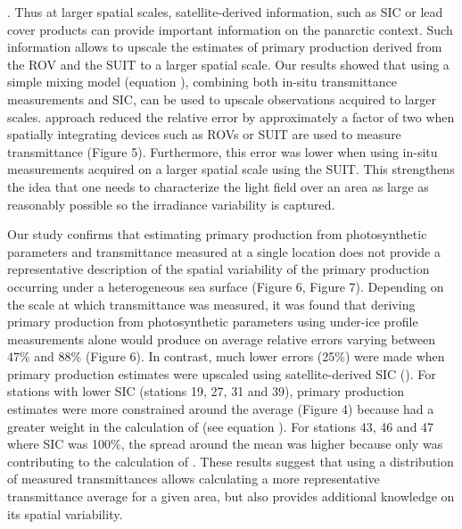 {{\citep{Assmy2017}}\hspace{0pt}%
. Thus at larger spatial scales, satellite-derived information, such as SIC or lead cover products can provide important information on the panarctic context. Such information allows to upscale the estimates of primary production derived from the ROV and the SUIT to a larger spatial scale. Our results showed that using a }\DIFaddend simple mixing model (equation \DIFdelbegin {}\DIFdelend \DIFaddbegin {}\DIFaddend ), combining both in-situ transmittance measurements and SIC, can be used to upscale observations acquired \DIFdelbegin {}\DIFdelend \DIFaddbegin {}\DIFaddend to larger scales. \DIFdelbegin {}\DIFdelend \DIFaddbegin {}\DIFaddend approach reduced the relative error by approximately a factor of two when spatially integrating devices such as ROVs or SUIT are used to measure transmittance (Figure 5). Furthermore, this error was lower when using in-situ measurements acquired on a larger spatial scale using the SUIT. This strengthens the idea that one needs to characterize the light field over an area as large as reasonably possible so the \DIFdelbegin {}\DIFdelend \DIFaddbegin {}\DIFaddend irradiance variability is captured.

Our study confirms \DIFdelbegin {}\DIFdelend \DIFaddbegin {}\DIFaddend that estimating primary production from photosynthetic parameters and transmittance measured at a single location does not provide a representative description of the spatial variability of the primary production occurring under a heterogeneous sea surface (Figure 6, Figure 7). Depending on the scale at which transmittance was measured, it was found that deriving primary production from photosynthetic parameters using under-ice profile measurements alone would produce on average relative errors varying between 47\% and 88\% (Figure 6). In contrast, much lower errors (25\%) were made when primary production estimates were upscaled using satellite-derived SIC (\ppmixing{}). For stations with lower SIC (stations 19, 27, 31 and 39), primary production estimates were more constrained around the average (Figure 4) because \ppopenwater{} had a greater weight in the calculation of \ppmixing{} (see equation \DIFdelbegin {}\DIFdelend \DIFaddbegin {}\DIFaddend ). For stations 43, 46 and 47 where SIC was 100\%, the spread around the mean was higher because only \ppunderice{} was contributing to the calculation of \ppmixing{}. These results suggest that using a distribution of measured transmittances allows calculating a more representative transmittance average for a given area, but also provides additional knowledge on its spatial variability.

